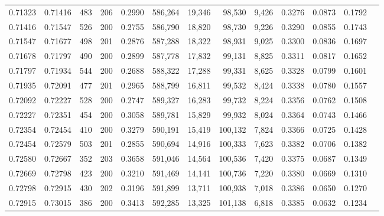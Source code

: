 \begin{tabular}{rrrrrrrrrrrrr}
0.71323 & 0.71416 &   483 & 206 &                                     0.2990 & 586,264 &  19,346 &  98,530 &   9,426 & 0.3276 & 0.0873 & 0.1792 \\
0.71416 & 0.71547 &   526 & 200 &                                     0.2755 & 586,790 &  18,820 &  98,730 &   9,226 & 0.3290 & 0.0855 & 0.1743 \\
0.71547 & 0.71677 &   498 & 201 &                                     0.2876 & 587,288 &  18,322 &  98,931 &   9,025 & 0.3300 & 0.0836 & 0.1697 \\
0.71678 & 0.71797 &   490 & 200 &                                     0.2899 & 587,778 &  17,832 &  99,131 &   8,825 & 0.3311 & 0.0817 & 0.1652 \\
0.71797 & 0.71934 &   544 & 200 &                                     0.2688 & 588,322 &  17,288 &  99,331 &   8,625 & 0.3328 & 0.0799 & 0.1601 \\
0.71935 & 0.72091 &   477 & 201 &                                     0.2965 & 588,799 &  16,811 &  99,532 &   8,424 & 0.3338 & 0.0780 & 0.1557 \\
0.72092 & 0.72227 &   528 & 200 &                                     0.2747 & 589,327 &  16,283 &  99,732 &   8,224 & 0.3356 & 0.0762 & 0.1508 \\
0.72227 & 0.72351 &   454 & 200 &                                     0.3058 & 589,781 &  15,829 &  99,932 &   8,024 & 0.3364 & 0.0743 & 0.1466 \\
0.72354 & 0.72454 &   410 & 200 &                                     0.3279 & 590,191 &  15,419 & 100,132 &   7,824 & 0.3366 & 0.0725 & 0.1428 \\
0.72454 & 0.72579 &   503 & 201 &                                     0.2855 & 590,694 &  14,916 & 100,333 &   7,623 & 0.3382 & 0.0706 & 0.1382 \\
0.72580 & 0.72667 &   352 & 203 &                                     0.3658 & 591,046 &  14,564 & 100,536 &   7,420 & 0.3375 & 0.0687 & 0.1349 \\
0.72669 & 0.72798 &   423 & 200 &                                     0.3210 & 591,469 &  14,141 & 100,736 &   7,220 & 0.3380 & 0.0669 & 0.1310 \\
0.72798 & 0.72915 &   430 & 202 &                                     0.3196 & 591,899 &  13,711 & 100,938 &   7,018 & 0.3386 & 0.0650 & 0.1270 \\
0.72915 & 0.73015 &   386 & 200 &                                     0.3413 & 592,285 &  13,325 & 101,138 &   6,818 & 0.3385 & 0.0632 & 0.1234 \\

\end{tabular}
